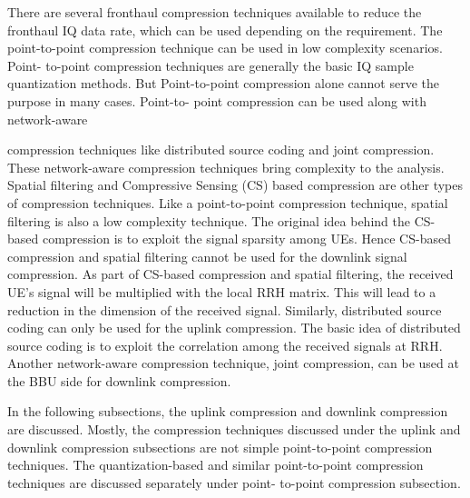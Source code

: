 \begin{multicols}{2}



There are several fronthaul compression techniques available to reduce the fronthaul IQ data rate, which can be used depending on the requirement. The point-to-point compression technique can be used in low complexity scenarios. Point- to-point compression techniques are generally the basic IQ sample quantization methods. But Point-to-point compression alone cannot serve the purpose in many cases. Point-to- point compression can be used along with network-aware

compression techniques like distributed source coding and joint compression. These network-aware compression techniques bring complexity to the analysis. Spatial filtering and Compressive Sensing (CS) based compression are other types of compression techniques. Like a point-to-point compression technique, spatial filtering is also a low complexity technique. The original idea behind the CS-based compression is to exploit the signal sparsity among UEs. Hence CS-based compression and spatial filtering cannot be used for the downlink signal compression. As part of CS-based compression and spatial filtering, the received UE’s signal will be multiplied with the local RRH matrix. This will lead to a reduction in the dimension of the received signal. Similarly, distributed source coding can only be used for the uplink compression. The basic idea of distributed source coding is to exploit the correlation among the received signals at RRH. Another network-aware compression technique, joint compression, can be used at the BBU side for downlink compression.

In the following subsections, the uplink compression and downlink compression are discussed. Mostly, the compression techniques discussed under the uplink and downlink compression subsections are not simple point-to-point compression techniques. The quantization-based and similar point-to-point compression techniques are discussed separately under point- to-point compression subsection.

\begin{itemize}


\end{itemize}
\end{multicols}
